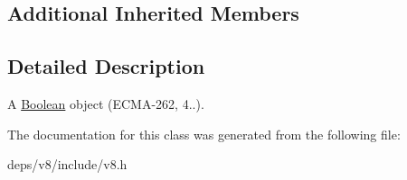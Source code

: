 \subsection*{Additional Inherited Members}


\subsection{Detailed Description}
A \hyperlink{classv8_1_1_boolean}{Boolean} object (E\+C\+M\+A-\/262, 4..). 

The documentation for this class was generated from the following file\+:\begin{DoxyCompactItemize}
\item 
deps/v8/include/v8.\+h\end{DoxyCompactItemize}
